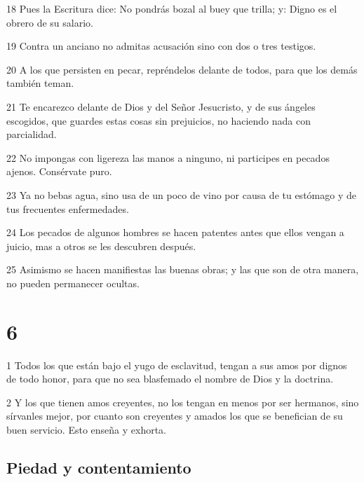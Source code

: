 \par 18 Pues la Escritura dice: No pondrás bozal al buey que trilla; y: Digno es el obrero de su salario.
\par 19 Contra un anciano no admitas acusación sino con dos o tres testigos.
\par 20 A los que persisten en pecar, repréndelos delante de todos, para que los demás también teman.
\par 21 Te encarezco delante de Dios y del Señor Jesucristo, y de sus ángeles escogidos, que guardes estas cosas sin prejuicios, no haciendo nada con parcialidad.
\par 22 No impongas con ligereza las manos a ninguno, ni participes en pecados ajenos. Consérvate puro.
\par 23 Ya no bebas agua, sino usa de un poco de vino por causa de tu estómago y de tus frecuentes enfermedades.
\par 24 Los pecados de algunos hombres se hacen patentes antes que ellos vengan a juicio, mas a otros se les descubren después.
\par 25 Asimismo se hacen manifiestas las buenas obras; y las que son de otra manera, no pueden permanecer ocultas.

\chapter{6}

\par 1 Todos los que están bajo el yugo de esclavitud, tengan a sus amos por dignos de todo honor, para que no sea blasfemado el nombre de Dios y la doctrina.
\par 2 Y los que tienen amos creyentes, no los tengan en menos por ser hermanos, sino sírvanles mejor, por cuanto son creyentes y amados los que se benefician de su buen servicio. Esto enseña y exhorta.

\section*{Piedad y contentamiento}

